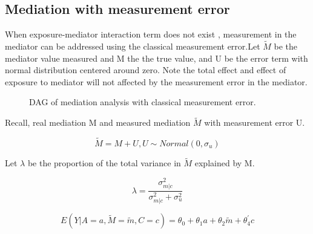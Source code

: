 \documentclass{article}
\begin{document}
\subsection{Mediation with measurement error}

When exposure-mediator interaction term does not exist , measurement in the mediator can be addressed using the classical measurement error\cite{le2012quantification}.Let $\tilde M $ be the mediator value measured and M the the true value, and U be the error term with normal distribution centered around zero. Note the total effect and effect of exposure to mediator will not affected by the measurement error in the mediator. \cite{carroll2006measurement}\cite{le2012quantification}


\begin{figure}[h]
\centering
{}
\caption{DAG of mediation analysis with classical measurement error.  }
\label{dag1}
\end{figure}

Recall, real mediation M and measured mediation $\tilde M$ with measurement error U.\newline

\begin{equation}
\tilde M = M + U, U \sim Normal(0, \sigma_u)
\end{equation}

Let $\lambda$ be the proportion of the total variance in $\tilde M $ explained by M. 


\begin{equation}
\lambda = \frac{\sigma_{m|c}^2}{\sigma_{m|c}^2 + \sigma_{u}^2}
\end{equation}

\begin{equation}
E(Y | A = a, \tilde M = \tilde m, C =c) = \theta_0+\theta_1 a+ \theta_2 \tilde m  + \theta_4^{'} c
\end{equation}
\end{document}
